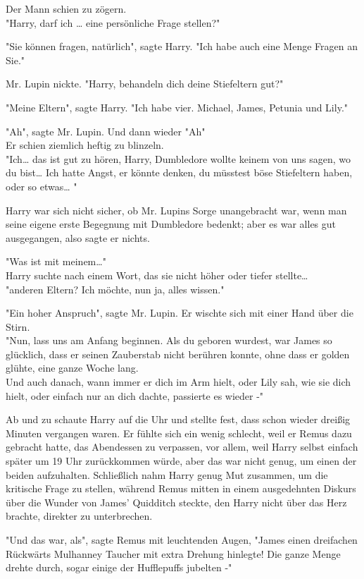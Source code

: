 {Der Mann schien zu zögern.\\ "Harry, darf ich … eine persönliche Frage stellen?"

"Sie können fragen, natürlich", sagte Harry. "Ich habe auch eine Menge Fragen an Sie."

Mr. Lupin nickte. "Harry, behandeln dich deine Stiefeltern gut?"

"Meine Eltern", sagte Harry. "Ich habe vier. Michael, James, Petunia und Lily."

"Ah", sagte Mr. Lupin. Und dann wieder "Ah"\\ Er schien ziemlich heftig zu blinzeln.\\ "Ich… das ist gut zu hören, Harry, Dumbledore wollte keinem von uns sagen, wo du bist… Ich hatte Angst, er könnte denken, du müsstest böse Stiefeltern haben, oder so etwas… "

Harry war sich nicht sicher, ob Mr. Lupins Sorge unangebracht war, wenn man seine eigene erste Begegnung mit Dumbledore bedenkt; aber es war alles gut ausgegangen, also sagte er nichts.

"Was ist mit meinem…"\\ Harry suchte nach einem Wort, das sie nicht höher oder tiefer stellte…\\ "anderen Eltern? Ich möchte, nun ja, alles wissen."

"Ein hoher Anspruch", sagte Mr. Lupin. Er wischte sich mit einer Hand über die Stirn.\\ "Nun, lass uns am Anfang beginnen. Als du geboren wurdest, war James so glücklich, dass er seinen Zauberstab nicht berühren konnte, ohne dass er golden glühte, eine ganze Woche lang.\\ Und auch danach, wann immer er dich im Arm hielt, oder Lily sah, wie sie dich hielt, oder einfach nur an dich dachte, passierte es wieder -"

Ab und zu schaute Harry auf die Uhr und stellte fest, dass schon wieder dreißig Minuten vergangen waren. Er fühlte sich ein wenig schlecht, weil er Remus dazu gebracht hatte, das Abendessen zu verpassen, vor allem, weil Harry selbst einfach später um 19 Uhr zurückkommen würde, aber das war nicht genug, um einen der beiden aufzuhalten. Schließlich nahm Harry genug Mut zusammen, um die kritische Frage zu stellen, während Remus mitten in einem ausgedehnten Diskurs über die Wunder von James' Quidditch steckte, den Harry nicht über das Herz brachte, direkter zu unterbrechen.

"Und das war, als", sagte Remus mit leuchtenden Augen, "James einen dreifachen Rückwärts Mulhanney Taucher mit extra Drehung hinlegte! Die ganze Menge drehte durch, sogar einige der Hufflepuffs jubelten -"

}
